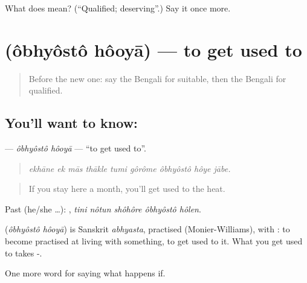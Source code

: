 \begin{tcolorbox}[breakable,colback=teal!4,colframe=teal!35!black,title={Before you move on}]
What does  mean? (\textquotedblleft{}Qualified; deserving\textquotedblright{}.) Say it once more.
\end{tcolorbox}
\section[\texorpdfstring{\bn{অভ্যস্ত} \bn{হওয়া} (ôbhyôstô hôoyā)}{অভ্যস্ত হওয়া (ôbhyôstô hôoyā)}]{  (ôbhyôstô hôoyā) — to get used to}

\label{lesson:BN-C380-obhyosto-hooya}



\begin{quote}
Before the new one: say the Bengali for suitable, then the Bengali for qualified.
\end{quote}

\subsection*{You'll want to know:  }
\textbf{ } — \emph{ôbhyôstô hôoyā} — \textquotedblleft{}to get used to\textquotedblright{}.

\begin{quote}
        
\end{quote}

\begin{quote}
\emph{ekhāne ek mās thākle tumi gôrôme ôbhyôstô hôye jābe.}
\end{quote}

\begin{quote}
If you stay here a month, you'll get used to the heat.
\end{quote}

Past (he/she …):     , \emph{tini nôtun shôhôre ôbhyôstô hôlen}.

\begin{cousinweb}
\textbf{ } (\emph{ôbhyôstô hôoyā}) is Sanskrit \emph{abhyasta}, practised (Monier-Williams), with : to become practised at living with something, to get used to it. What you get used to takes -.
\end{cousinweb}

\begin{grammarlens}[title={What you've built}]
One more word for saying what happens if.
\end{grammarlens}

